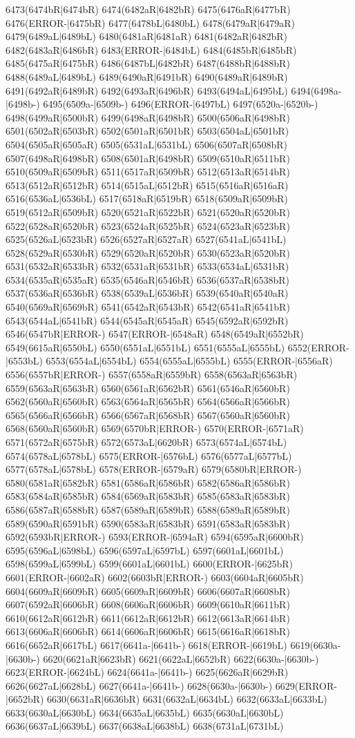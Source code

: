 6473(6474bR|6474bR) 6474(6482aR|6482bR) 6475(6476aR|6477bR) 6476(ERROR-|6475bR) 6477(6478bL|6480bL) 6478(6479aR|6479aR) 6479(6489aL|6489bL) 6480(6481aR|6481aR) 6481(6482aR|6482bR) 6482(6483aR|6486bR) 6483(ERROR-|6484bL) 6484(6485bR|6485bR) 6485(6475aR|6475bR) 6486(6487bL|6482bR) 6487(6488bR|6488bR) 6488(6489aL|6489bL) 6489(6490aR|6491bR) 6490(6489aR|6489bR) 6491(6492aR|6489bR) 6492(6493aR|6496bR) 6493(6494aL|6495bL) 6494(6498a-|6498b-) 6495(6509a-|6509b-) 6496(ERROR-|6497bL) 6497(6520a-|6520b-) 6498(6499aR|6500bR) 6499(6498aR|6498bR) 6500(6506aR|6498bR) 6501(6502aR|6503bR) 6502(6501aR|6501bR) 6503(6504aL|6501bR) 6504(6505aR|6505aR) 6505(6531aL|6531bL) 6506(6507aR|6508bR) 6507(6498aR|6498bR) 6508(6501aR|6498bR) 6509(6510aR|6511bR) 6510(6509aR|6509bR) 6511(6517aR|6509bR) 6512(6513aR|6514bR) 6513(6512aR|6512bR) 6514(6515aL|6512bR) 6515(6516aR|6516aR) 6516(6536aL|6536bL) 6517(6518aR|6519bR) 6518(6509aR|6509bR) 6519(6512aR|6509bR) 6520(6521aR|6522bR) 6521(6520aR|6520bR) 6522(6528aR|6520bR) 6523(6524aR|6525bR) 6524(6523aR|6523bR) 6525(6526aL|6523bR) 6526(6527aR|6527aR) 6527(6541aL|6541bL) 6528(6529aR|6530bR) 6529(6520aR|6520bR) 6530(6523aR|6520bR) 6531(6532aR|6533bR) 6532(6531aR|6531bR) 6533(6534aL|6531bR) 6534(6535aR|6535aR) 6535(6546aR|6546bR) 6536(6537aR|6538bR) 6537(6536aR|6536bR) 6538(6539aL|6536bR) 6539(6540aR|6540aR) 6540(6569aR|6569bR) 6541(6542aR|6543bR) 6542(6541aR|6541bR) 6543(6544aL|6541bR) 6544(6545aR|6545aR) 6545(6592aR|6592bR) 6546(6547bR|ERROR-) 6547(ERROR-|6548aR) 6548(6549aR|6552bR) 6549(6615aR|6550bL) 6550(6551aL|6551bL) 6551(6555aL|6555bL) 6552(ERROR-|6553bL) 6553(6554aL|6554bL) 6554(6555aL|6555bL) 6555(ERROR-|6556aR) 6556(6557bR|ERROR-) 6557(6558aR|6559bR) 6558(6563aR|6563bR) 6559(6563aR|6563bR) 6560(6561aR|6562bR) 6561(6546aR|6560bR) 6562(6560aR|6560bR) 6563(6564aR|6565bR) 6564(6566aR|6566bR) 6565(6566aR|6566bR) 6566(6567aR|6568bR) 6567(6560aR|6560bR) 6568(6560aR|6560bR) 6569(6570bR|ERROR-) 6570(ERROR-|6571aR) 6571(6572aR|6575bR) 6572(6573aL|6620bR) 6573(6574aL|6574bL) 6574(6578aL|6578bL) 6575(ERROR-|6576bL) 6576(6577aL|6577bL) 6577(6578aL|6578bL) 6578(ERROR-|6579aR) 6579(6580bR|ERROR-) 6580(6581aR|6582bR) 6581(6586aR|6586bR) 6582(6586aR|6586bR) 6583(6584aR|6585bR) 6584(6569aR|6583bR) 6585(6583aR|6583bR) 6586(6587aR|6588bR) 6587(6589aR|6589bR) 6588(6589aR|6589bR) 6589(6590aR|6591bR) 6590(6583aR|6583bR) 6591(6583aR|6583bR) 6592(6593bR|ERROR-) 6593(ERROR-|6594aR) 6594(6595aR|6600bR) 6595(6596aL|6598bL) 6596(6597aL|6597bL) 6597(6601aL|6601bL) 6598(6599aL|6599bL) 6599(6601aL|6601bL) 6600(ERROR-|6625bR) 6601(ERROR-|6602aR) 6602(6603bR|ERROR-) 6603(6604aR|6605bR) 6604(6609aR|6609bR) 6605(6609aR|6609bR) 6606(6607aR|6608bR) 6607(6592aR|6606bR) 6608(6606aR|6606bR) 6609(6610aR|6611bR) 6610(6612aR|6612bR) 6611(6612aR|6612bR) 6612(6613aR|6614bR) 6613(6606aR|6606bR) 6614(6606aR|6606bR) 6615(6616aR|6618bR) 6616(6652aR|6617bL) 6617(6641a-|6641b-) 6618(ERROR-|6619bL) 6619(6630a-|6630b-) 6620(6621aR|6623bR) 6621(6622aL|6652bR) 6622(6630a-|6630b-) 6623(ERROR-|6624bL) 6624(6641a-|6641b-) 6625(6626aR|6629bR) 6626(6627aL|6628bL) 6627(6641a-|6641b-) 6628(6630a-|6630b-) 6629(ERROR-|6652bR) 6630(6631aR|6636bR) 6631(6632aL|6634bL) 6632(6633aL|6633bL) 6633(6630aL|6630bL) 6634(6635aL|6635bL) 6635(6630aL|6630bL) 6636(6637aL|6639bL) 6637(6638aL|6638bL) 6638(6731aL|6731bL) 